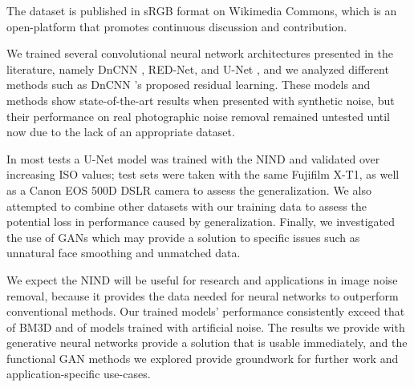 The dataset is published in sRGB format on Wikimedia Commons, which is an open-platform that promotes continuous discussion and contribution.


We trained several convolutional neural network architectures presented in the literature, namely DnCNN \cite{dncnn}, \ac{RED-Net}, and U-Net \cite{unet}, and we analyzed different methods such as DnCNN \cite{dncnn}'s proposed residual learning. These models and methods show state-of-the-art results when presented with synthetic noise, but their performance on real photographic noise removal remained untested until now due to the lack of an appropriate dataset.

In most tests a U-Net model was trained with the \ac{NIND} and validated over increasing ISO values; test sets were taken with the same Fujifilm X-T1, as well as a Canon EOS 500D DSLR camera to assess the generalization. We also attempted to combine other datasets with our training data to assess the potential loss in performance caused by generalization. %
Finally, we investigated the use of \aclp{GAN} \cite{pix2pix} which may provide a solution to specific issues such as unnatural face smoothing and unmatched data.

We expect the \acl{NIND} will be useful for research and applications in image noise removal, because it provides the data needed for neural networks to outperform conventional methods. Our trained models' performance consistently exceed that of \ac{BM3D} and of models trained with artificial noise. The results we provide with generative neural networks provide a solution that is usable immediately, and the functional \acl{GAN} methods we explored provide groundwork for further work and application-specific use-cases.



